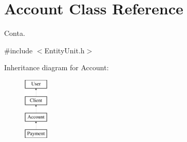 \hypertarget{classAccount}{\section{Account Class Reference}
\label{classAccount}
}


Conta.  




{\ttfamily \#include $<$Entity\-Unit.\-h$>$}

Inheritance diagram for Account\-:\begin{figure}[H]
\begin{center}
\leavevmode
\includegraphics[height=3.000000cm]{classAccount}
\end{center}
\end{figure}
